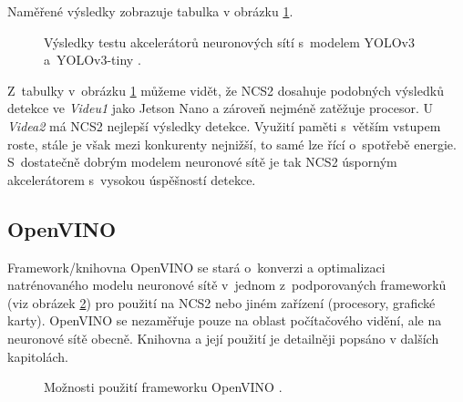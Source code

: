 \noindent Naměřené výsledky zobrazuje tabulka v obrázku \ref{obrazek:ncs2test}.

\begin{figure}[H]
  \begin{center}
  \label{obrazek:ncs2test}
  \caption{Výsledky testu akcelerátorů neuronových sítí s~modelem YOLOv3 a~YOLOv3-tiny \cite{ncs2testYolo}.}
  \end{center}
\end{figure}

Z~tabulky v~obrázku \ref{obrazek:ncs2test} můžeme vidět, že NCS2 dosahuje podobných výsledků detekce ve \emph{Videu1} jako Jetson Nano a zároveň nejméně zatěžuje procesor. U \emph{Videa2} má NCS2 nejlepší výsledky detekce. Využití paměti s~větším vstupem roste, stále je však mezi konkurenty nejnižší, to samé lze řící o~spotřebě energie. S~dostatečně dobrým modelem neuronové sítě je tak NCS2 úsporným akcelerátorem s~vysokou úspěšností detekce.


\subsection*{OpenVINO}
Framework/knihovna OpenVINO se stará o~konverzi a optimalizaci natrénovaného modelu neuronové sítě v~jednom z~podporovaných frameworků (viz obrázek \ref{obrazek:ovchart}) pro použití na NCS2 nebo jiném zařízení (procesory, grafické karty). OpenVINO se nezaměřuje pouze na oblast počítačového vidění, ale na neuronové sítě obecně. Knihovna a její použití je detailněji popsáno v dalších kapitolách.

\begin{figure}[H]
  \begin{center}
  \label{obrazek:ovchart}
  \caption{Možnosti použití frameworku OpenVINO \cite{openvino}.}
  \end{center}
\end{figure}

